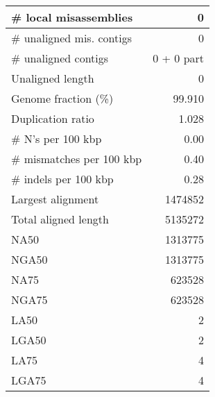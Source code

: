 \documentclass[12pt,a4paper]{article}
\begin{document}
\begin{table}[ht]
\begin{center}
\begin{tabular}{|l*{1}{|r}|}
\# local misassemblies & 0 \\ \hline
\# unaligned mis. contigs & 0 \\ \hline
\# unaligned contigs & 0 + 0 part \\ \hline
Unaligned length & 0 \\ \hline
Genome fraction (\%) & 99.910 \\ \hline
Duplication ratio & 1.028 \\ \hline
\# N's per 100 kbp & 0.00 \\ \hline
\# mismatches per 100 kbp & 0.40 \\ \hline
\# indels per 100 kbp & 0.28 \\ \hline
Largest alignment & 1474852 \\ \hline
Total aligned length & 5135272 \\ \hline
NA50 & 1313775 \\ \hline
NGA50 & 1313775 \\ \hline
NA75 & 623528 \\ \hline
NGA75 & 623528 \\ \hline
LA50 & 2 \\ \hline
LGA50 & 2 \\ \hline
LA75 & 4 \\ \hline
LGA75 & 4 \\ \hline
\end{tabular}
\end{center}
\end{table}
\end{document}
